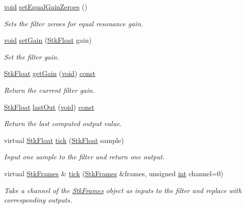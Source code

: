 \begin{DoxyCompactItemize}
\hyperlink{sound_8c_ae35f5844602719cf66324f4de2a658b3}{void} \hyperlink{class_nyq_1_1_bi_quad_aa3feee25280fe032798b61e8c0906127}{set\+Equal\+Gain\+Zeroes} ()
\begin{DoxyCompactList}\small\item\em Sets the filter zeroes for equal resonance gain. \end{DoxyCompactList}\item 
\hyperlink{sound_8c_ae35f5844602719cf66324f4de2a658b3}{void} \hyperlink{class_nyq_1_1_bi_quad_a3d803fc145fbd89cb2031899523879ef}{set\+Gain} (\hyperlink{namespace_nyq_a044fa20a706520a617bbbf458a7db7e4}{Stk\+Float} gain)
\begin{DoxyCompactList}\small\item\em Set the filter gain. \end{DoxyCompactList}\item 
\hyperlink{namespace_nyq_a044fa20a706520a617bbbf458a7db7e4}{Stk\+Float} \hyperlink{class_nyq_1_1_bi_quad_a6ddffca9c4fa97a3a4b81d25d0789b63}{get\+Gain} (\hyperlink{sound_8c_ae35f5844602719cf66324f4de2a658b3}{void}) \hyperlink{getopt1_8c_a2c212835823e3c54a8ab6d95c652660e}{const} 
\begin{DoxyCompactList}\small\item\em Return the current filter gain. \end{DoxyCompactList}\item 
\hyperlink{namespace_nyq_a044fa20a706520a617bbbf458a7db7e4}{Stk\+Float} \hyperlink{class_nyq_1_1_bi_quad_a2d4644277f6ed03c035e8fd13330c0d8}{last\+Out} (\hyperlink{sound_8c_ae35f5844602719cf66324f4de2a658b3}{void}) \hyperlink{getopt1_8c_a2c212835823e3c54a8ab6d95c652660e}{const} 
\begin{DoxyCompactList}\small\item\em Return the last computed output value. \end{DoxyCompactList}\item 
virtual \hyperlink{namespace_nyq_a044fa20a706520a617bbbf458a7db7e4}{Stk\+Float} \hyperlink{class_nyq_1_1_bi_quad_a0670d4e8b07d04791447e2d1b0a2f6ad}{tick} (\hyperlink{namespace_nyq_a044fa20a706520a617bbbf458a7db7e4}{Stk\+Float} sample)
\begin{DoxyCompactList}\small\item\em Input one sample to the filter and return one output. \end{DoxyCompactList}\item 
virtual \hyperlink{class_nyq_1_1_stk_frames}{Stk\+Frames} \& \hyperlink{class_nyq_1_1_bi_quad_a99c570091ae10b7dc294f7c24115cfc3}{tick} (\hyperlink{class_nyq_1_1_stk_frames}{Stk\+Frames} \&frames, unsigned \hyperlink{xmltok_8h_a5a0d4a5641ce434f1d23533f2b2e6653}{int} channel=0)
\begin{DoxyCompactList}\small\item\em Take a channel of the \hyperlink{class_nyq_1_1_stk_frames}{Stk\+Frames} object as inputs to the filter and replace with corresponding outputs. \end{DoxyCompactList}\end{DoxyCompactItemize}
